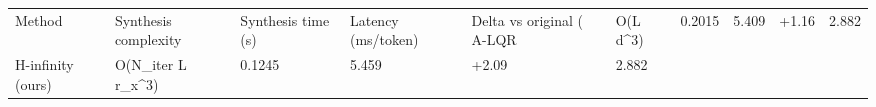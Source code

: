 \begin{tabular}{llllll}
\toprule
Method & Synthesis complexity & Synthesis time (s) & Latency (ms/token) & Delta vs original (%
\midrule
A-LQR & O(L d^3) & 0.2015 & 5.409 & +1.16 & 2.882 \\
H-infinity (ours) & O(N_iter L r_x^3) & 0.1245 & 5.459 & +2.09 & 2.882 \\
\bottomrule
\end{tabular}
